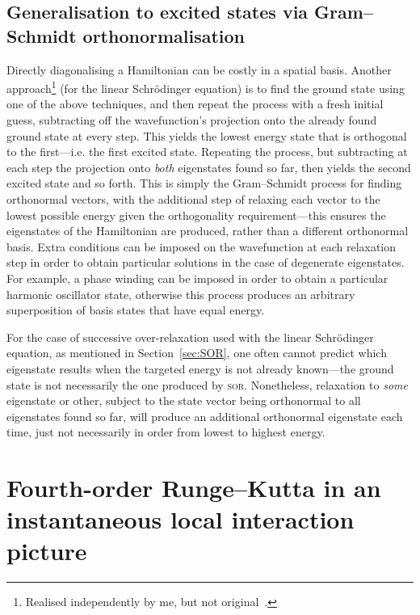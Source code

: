 \subsection{Generalisation to excited states via Gram–Schmidt orthonormalisation}\label{sec:excited_states_gram_schmidt}
Directly diagonalising a Hamiltonian can be costly in a spatial basis. Another approach\footnote{Realised independently by me, but not original~\cite{ahn_variational_1986}.} (for the linear Schr\"odinger equation) is to find the ground state using one of the above techniques, and then repeat the process with a fresh initial guess, subtracting off the wavefunction's projection onto the already found ground state at every step. This yields the lowest energy state that is orthogonal to the first---i.e. the first excited state. Repeating the process, but subtracting at each step the projection onto \emph{both} eigenstates found so far, then yields the second excited state and so forth. This is simply the Gram--Schmidt process for finding orthonormal vectors, with the additional step of relaxing each vector to the lowest possible energy given the orthogonality requirement---this ensures the eigenstates of the Hamiltonian are produced, rather than a different orthonormal basis. Extra conditions can be imposed on the wavefunction at each relaxation step in order to obtain particular solutions in the case of degenerate eigenstates. For example, a phase winding can be imposed in order to obtain a particular harmonic oscillator state, otherwise this process produces an arbitrary superposition of basis states that have equal energy.

For the case of successive over-relaxation used with the linear Schr\"odinger equation, as mentioned in Section~\ref{sec:SOR}, one often cannot predict which eigenstate results when the targeted energy is not already known---the ground state is not necessarily the one produced by \textsc{sor}. Nonetheless, relaxation to \emph{some} eigenstate or other, subject to the state vector being orthonormal to all eigenstates found so far, will produce an additional orthonormal eigenstate each time, just not necessarily in order from lowest to highest energy.

\section{Fourth-order Runge--Kutta in an instantaneous local interaction picture}\label{sec:rk4ilip}


